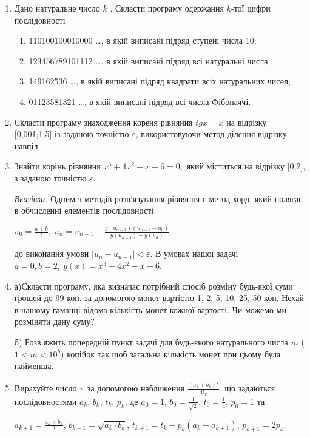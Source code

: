 \documentclass[a5paper,titlepage,openany,twoside,
]
{book_unv}%
\makeatletter
\newcommand{\xslalph}[1]{\expandafter\@xslalph\csname c@#1\endcsname}
\newcommand{\@xslalph}[1]{%
    \ifcase#1\or а\or б\or в\or г\or д\or e\or є\or ж\or з\or i%
    \or й\or к\or л\or м\or н\or о\or п\or р\or с\or т%
    \or у\or ф\or х\or ц\or ч\or ш\or ю\or я\or аа\or бб\or вв%
    \else\@ctrerr\fi%
}
\makeatother
\begin{document}
\begin{enumerate}
\def\labelenumi{\arabic{enumi})}
\setcounter{enumi}{16}
\item
  Дано натуральне число $k$ . Скласти програму одержання $k$-тої цифри послідовності
\begin{enumerate}[label=\xslalph*)]
\item 110100100010000 \ldots , в якій виписані підряд ступені числа 10;
\item 123456789101112 \ldots , в якій виписані підряд всі натуральні числа;
\item 149162536 \ldots , в якій виписані підряд квадрати всіх натуральних
чисел;
\item 01123581321 \ldots , в якій виписані підряд всі числа Фібоначчі.

\end{enumerate}

\item
  Скласти програму знаходження кореня рівняння \(tgx = x\) на відрізку
  {[}0,001;1,5{]} із заданою точністю \(\varepsilon\), використовуючи
  метод ділення відрізку навпіл.
\item
  Знайти корінь рівняння \(x^{3} + 4x^{2} + x - 6 = 0,\) який міститься
  на відрізку {[}0,2{]}, з заданою точністю \(\varepsilon\).

\emph{\emph{Вказівка.}} Одним з методів розв`язування рівняння є метод
хорд, який полягає в обчисленні елементів послідовності 

\(u_{0} = \frac{a+b}{2}, \;  u_{n} = u_{n-1} - \frac{y(u_{n-1}) (u_{n-1} -u_{0})}{y(u_{n-1}) -y(u_{0})} \) 

до виконання умови \(\left| u_{n} - u_{n - 1} \right| < \varepsilon\). В
умовах нашої задачі \(a = 0,b = 2,\ y(x) = x^{3} + 4x^{2} + x - 6.\)

\item
  а)Скласти програму, яка визначає потрібний спосіб розміну будь-якої
  суми грошей до 99 коп. за допомогою монет вартістю 1, 2, 5, 10, 25, 50
  коп. Нехай в нашому гаманці відома кількість монет кожної вартості.
Чи можемо ми розміняти дану суму?

  б) Розв'яжить попередній пункт задачі для будь-якого натурального числа $m$
($1<m<10^{8}$) копійок так щоб загальна кількість монет при
цьому була найменша.

\item
Вирахуйте число $\pi$ за допомогою наближення $\frac{(a_{k} + b_{k})^{2}}{4t_{k}}$,
що задаються послідовностями $a_k$, $b_k$, $t_k$, $p_k$, де
$a_0 = 1$, $b_0 = \frac{1}{\sqrt{2}}$, $t_0 = \frac{1}{4}$, $p_0 = 1$ та

$a_{k+1} = \frac{a_{k} + b_{k}}{2}$, $b_{k+1} = \sqrt{a_{k}\cdot b_{k}}$, 
$t_{k+1} = t_{k} - p_{k}(a_{k}-a_{k+1})$, $p_{k+1} =2p_{k}$.

 
\end{enumerate}
\end{document}
